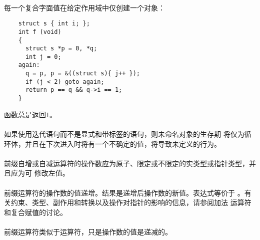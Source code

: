 {\paragraph{}
\ex 每一个复合字面值在给定作用域中仅创建一个对象：
\begin{lstlisting}
    struct s { int i; };
    int f (void)
    {
      struct s *p = 0, *q;
      int j = 0;
    again:
      q = p, p = &((struct s){ j++ });
      if (j < 2) goto again;
      return p == q && q->i == 1;
    }
\end{lstlisting}
函数总是返回$1$。

\paragraph{}
\notes* 如果使用迭代语句而不是显式和带标签的语句，则未命名对象的生存期
将仅为循环体，并且在下次进入时将有一个不确定的值，将导致未定义的行为。


\syntax
\paragraph{}
  \synprd[]{\tm{\&\ \ *\ \ +\ \ -\ \ \~\ \ !}}

\constraint
\paragraph{}
前缀自增或自减运算符的操作数应为原子、限定或不限定的实类型或指针类型，并且应为可
修改左值。

\semantic
\paragraph{}
前缀\tm{++}运算符的操作数的值递增。结果是递增后操作数的新值。表达式等价于
。有关约束、类型、副作用和转换以及操作对指针的影响的信息，请参阅加法
运算符和复合赋值的讨论。

\paragraph{}
前缀\tm{-\dsh}运算符类似于\tm{++}运算符，只是操作数的值是递减的。

}
